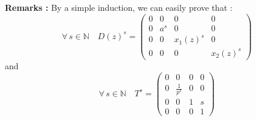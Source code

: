 \documentclass{article}
\begin{document}
\begin{flushleft}
\textbf{Remarks :} 
\medbreak
By a simple induction, we can easily prove that :
\begin{equation}
\forall \, s\in \mathbb{N} \quad
D(z)^{s} = 
\begin{pmatrix} 
0 & 0 & 0 &  0 \\
0 & a^{s} & 0 & 0\\
0 & 0 & x_{1}(z)^{s} &  0\\
0 & 0 &  0&  x_{2}(z)^{s}
\end{pmatrix}
\end{equation}
and
\begin{equation}
\forall \, s\in \mathbb{N} \quad
T^{s} = 
\begin{pmatrix} 
0 & 0 & 0 &  0 \\
0 & \frac{1}{p^{s}} & 0 & 0\\
0 & 0 & 1 &  s\\
0 & 0 &  0&  1
\end{pmatrix}
\end{equation}
\end{flushleft}
\end{document}
